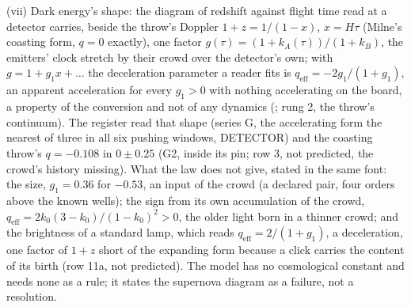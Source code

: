(vii) Dark energy's shape: the diagram of redshift against flight time read at a detector carries, beside the throw's Doppler $1 + z = 1/(1 - x)$, $x = H\tau$ (Milne's coasting form, $q = 0$ exactly), one factor $g(\tau) = (1 + k_A(\tau))/(1 + k_B)$, the emitters' clock stretch by their crowd over the detector's own; with $g = 1 + g_1 x + \dots$ the deceleration parameter a reader fits is $q_{\mathrm{eff}} = -2g_1/(1 + g_1)$, an apparent acceleration for every $g_1 > 0$ with nothing accelerating on the board, a property of the conversion and not of any dynamics (\cite{darkenergy}; rung 2, the throw's continuum). The register read that shape (series G, the accelerating form the nearest of three in all six pushing windows, DETECTOR) and the coasting throw's $q = -0.108$ in $0 \pm 0.25$ (G2, inside its pin; row 3, not predicted, the crowd's history missing). What the law does not give, stated in the same font: the size, $g_1 = 0.36$ for $-0.53$, an input of the crowd (a declared pair, four orders above the known wells); the sign from its own accumulation of the crowd, $q_{\mathrm{eff}} = 2k_0(3 - k_0)/(1 - k_0)^2 > 0$, the older light born in a thinner crowd; and the brightness of a standard lamp, which reads $q_{\mathrm{eff}} = 2/(1 + g_1)$, a deceleration, one factor of $1 + z$ short of the expanding form because a click carries the content of its birth (row 11a, not predicted). The model has no cosmological constant and needs none as a rule; it states the supernova diagram as a failure, not a resolution.

